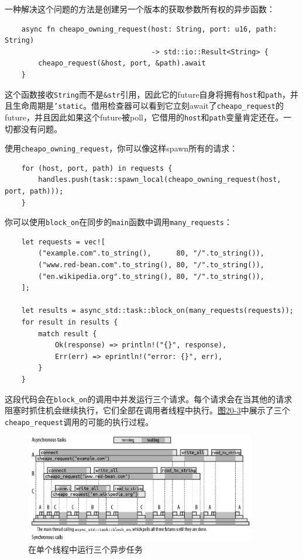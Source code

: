 一种解决这个问题的方法是创建另一个版本的获取参数所有权的异步函数：
\begin{verbatim}
    async fn cheapo_owning_request(host: String, port: u16, path: String)
                                   -> std::io::Result<String> {
        cheapo_request(&host, port, &path).await
    }
\end{verbatim}

这个函数接收\texttt{String}而不是\texttt{\&str}引用，因此它的future自身将拥有\texttt{host}和\texttt{path}，并且生命周期是\texttt{'static}。借用检查器可以看到它立刻await了\texttt{cheapo\_request}的future，并且因此如果这个future被poll，它借用的\texttt{host}和\texttt{path}变量肯定还在。一切都没有问题。

使用\texttt{cheapo\_owning\_request}，你可以像这样spawn所有的请求：
\begin{verbatim}
    for (host, port, path) in requests {
        handles.push(task::spawn_local(cheapo_owning_request(host, port, path)));
    }
\end{verbatim}

你可以使用\texttt{block\_on}在同步的\texttt{main}函数中调用\texttt{many\_requests}：
\begin{verbatim}
    let requests = vec![
        ("example.com".to_string(),      80, "/".to_string()),
        ("www.red-bean.com".to_string(), 80, "/".to_string()),
        ("en.wikipedia.org".to_string(), 80, "/".to_string()),
    ];

    let results = async_std::task::block_on(many_requests(requests));
    for result in results {
        match result {
            Ok(response) => println!("{}", response),
            Err(err) => eprintln!("error: {}", err),
        }
    }
\end{verbatim}

这段代码会在\texttt{block\_on}的调用中并发运行三个请求。每个请求会在当其他的请求阻塞时抓住机会继续执行，它们全部在调用者线程中执行。\hyperref[f20-3]{图20-3}中展示了三个\texttt{cheapo\_request}调用的可能的执行过程。

\begin{figure}[htbp]
    \centering
    \includegraphics[width=0.9\textwidth]{../img/f20-3.png}
    \caption{在单个线程中运行三个异步任务}
    \label{f20-3}
\end{figure}

